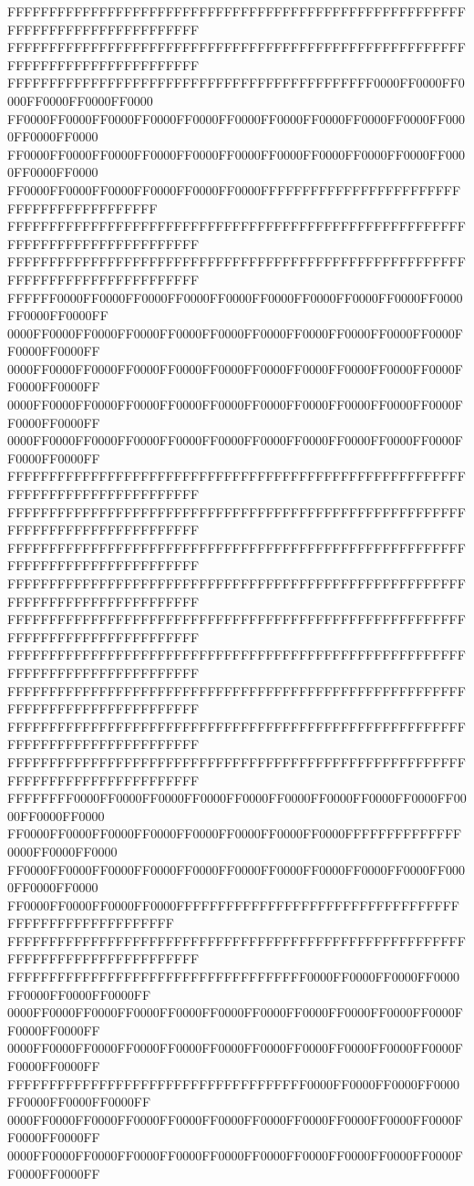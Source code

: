 FFFFFFFFFFFFFFFFFFFFFFFFFFFFFFFFFFFFFFFFFFFFFFFFFFFFFFFFFFFFFFFFFFFFFFFFFFFFFF
FFFFFFFFFFFFFFFFFFFFFFFFFFFFFFFFFFFFFFFFFFFFFFFFFFFFFFFFFFFFFFFFFFFFFFFFFFFFFF
FFFFFFFFFFFFFFFFFFFFFFFFFFFFFFFFFFFFFFFFFFFF0000FF0000FF0000FF0000FF0000FF0000
FF0000FF0000FF0000FF0000FF0000FF0000FF0000FF0000FF0000FF0000FF0000FF0000FF0000
FF0000FF0000FF0000FF0000FF0000FF0000FF0000FF0000FF0000FF0000FF0000FF0000FF0000
FF0000FF0000FF0000FF0000FF0000FF0000FFFFFFFFFFFFFFFFFFFFFFFFFFFFFFFFFFFFFFFFFF
FFFFFFFFFFFFFFFFFFFFFFFFFFFFFFFFFFFFFFFFFFFFFFFFFFFFFFFFFFFFFFFFFFFFFFFFFFFFFF
FFFFFFFFFFFFFFFFFFFFFFFFFFFFFFFFFFFFFFFFFFFFFFFFFFFFFFFFFFFFFFFFFFFFFFFFFFFFFF
FFFFFF0000FF0000FF0000FF0000FF0000FF0000FF0000FF0000FF0000FF0000FF0000FF0000FF
0000FF0000FF0000FF0000FF0000FF0000FF0000FF0000FF0000FF0000FF0000FF0000FF0000FF
0000FF0000FF0000FF0000FF0000FF0000FF0000FF0000FF0000FF0000FF0000FF0000FF0000FF
0000FF0000FF0000FF0000FF0000FF0000FF0000FF0000FF0000FF0000FF0000FF0000FF0000FF
0000FF0000FF0000FF0000FF0000FF0000FF0000FF0000FF0000FF0000FF0000FF0000FF0000FF
FFFFFFFFFFFFFFFFFFFFFFFFFFFFFFFFFFFFFFFFFFFFFFFFFFFFFFFFFFFFFFFFFFFFFFFFFFFFFF
FFFFFFFFFFFFFFFFFFFFFFFFFFFFFFFFFFFFFFFFFFFFFFFFFFFFFFFFFFFFFFFFFFFFFFFFFFFFFF
FFFFFFFFFFFFFFFFFFFFFFFFFFFFFFFFFFFFFFFFFFFFFFFFFFFFFFFFFFFFFFFFFFFFFFFFFFFFFF
FFFFFFFFFFFFFFFFFFFFFFFFFFFFFFFFFFFFFFFFFFFFFFFFFFFFFFFFFFFFFFFFFFFFFFFFFFFFFF
FFFFFFFFFFFFFFFFFFFFFFFFFFFFFFFFFFFFFFFFFFFFFFFFFFFFFFFFFFFFFFFFFFFFFFFFFFFFFF
FFFFFFFFFFFFFFFFFFFFFFFFFFFFFFFFFFFFFFFFFFFFFFFFFFFFFFFFFFFFFFFFFFFFFFFFFFFFFF
FFFFFFFFFFFFFFFFFFFFFFFFFFFFFFFFFFFFFFFFFFFFFFFFFFFFFFFFFFFFFFFFFFFFFFFFFFFFFF
FFFFFFFFFFFFFFFFFFFFFFFFFFFFFFFFFFFFFFFFFFFFFFFFFFFFFFFFFFFFFFFFFFFFFFFFFFFFFF
FFFFFFFFFFFFFFFFFFFFFFFFFFFFFFFFFFFFFFFFFFFFFFFFFFFFFFFFFFFFFFFFFFFFFFFFFFFFFF
FFFFFFFF0000FF0000FF0000FF0000FF0000FF0000FF0000FF0000FF0000FF0000FF0000FF0000
FF0000FF0000FF0000FF0000FF0000FF0000FF0000FF0000FFFFFFFFFFFFFF0000FF0000FF0000
FF0000FF0000FF0000FF0000FF0000FF0000FF0000FF0000FF0000FF0000FF0000FF0000FF0000
FF0000FF0000FF0000FF0000FFFFFFFFFFFFFFFFFFFFFFFFFFFFFFFFFFFFFFFFFFFFFFFFFFFFFF
FFFFFFFFFFFFFFFFFFFFFFFFFFFFFFFFFFFFFFFFFFFFFFFFFFFFFFFFFFFFFFFFFFFFFFFFFFFFFF
FFFFFFFFFFFFFFFFFFFFFFFFFFFFFFFFFFFF0000FF0000FF0000FF0000FF0000FF0000FF0000FF
0000FF0000FF0000FF0000FF0000FF0000FF0000FF0000FF0000FF0000FF0000FF0000FF0000FF
0000FF0000FF0000FF0000FF0000FF0000FF0000FF0000FF0000FF0000FF0000FF0000FF0000FF
FFFFFFFFFFFFFFFFFFFFFFFFFFFFFFFFFFFF0000FF0000FF0000FF0000FF0000FF0000FF0000FF
0000FF0000FF0000FF0000FF0000FF0000FF0000FF0000FF0000FF0000FF0000FF0000FF0000FF
0000FF0000FF0000FF0000FF0000FF0000FF0000FF0000FF0000FF0000FF0000FF0000FF0000FF
